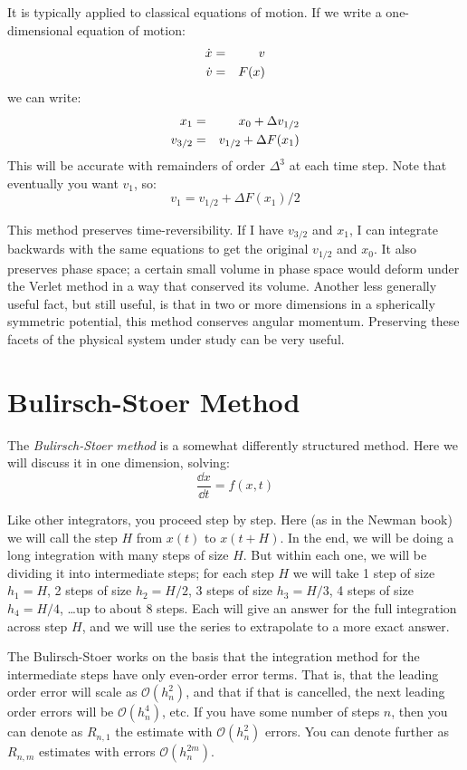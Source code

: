 It is typically applied to classical equations of motion. If we write
a one-dimensional equation of motion:
\begin{eqnarray}
{\dot x} &=& v \cr
{\dot v} &=& F(x)
\end{eqnarray}
we can write: 
\begin{eqnarray}
x_1 &=& x_0 + \Delta v_{1/2} \cr
v_{3/2} &=& v_{1/2} + \Delta F(x_1)
\end{eqnarray}
This will be accurate with remainders of order $\Delta^3$ at each time
step. Note that eventually you want $v_1$, so:
\begin{equation}
v_{1} = v_{1/2} + \Delta F(x_1) / 2
\end{equation}

This method preserves time-reversibility. If I have $v_{3/2}$ and
$x_1$, I can integrate backwards with the same equations to get the
original $v_{1/2}$ and $x_0$. It also preserves phase space; a certain
small volume in phase space would deform under the Verlet method in a
way that conserved its volume. Another less generally useful fact, but
still useful, is that in two or more dimensions in a spherically
symmetric potential, this method conserves angular
momentum. Preserving these facets of the physical system under study
can be very useful.

\section{Bulirsch-Stoer Method}

The {\it Bulirsch-Stoer method} is a somewhat differently structured
method. Here we will discuss it in one dimension, solving:
\begin{equation}
\frac{\dd{x}}{\dd{t}} = f(x,t)
\end{equation}

Like other integrators, you proceed step by step. Here (as in the
Newman book) we will call the step $H$ from $x(t)$ to $x(t+H)$. In the
end, we will be doing a long integration with many steps of size
$H$. But within each one, we will be dividing it into intermediate
steps; for each step $H$ we will take 1 step of size $h_1 =H$, 2 steps
of size $h_2 = H / 2$, 3 steps of size $h_3 = H/3$, 4 steps of size
$h_4 = H / 4$, \ldots up to about 8 steps.  Each will give an answer
for the full integration across step $H$, and we will use the series
to extrapolate to a more exact answer.

The Bulirsch-Stoer works on the basis that the integration method for
the intermediate steps have only even-order error terms. That is, that
the leading order error will scale as $\mathcal{O}(h_n^{2})$, and that
if that is cancelled, the next leading order errors will be
$\mathcal{O}(h_n^4)$, etc. If you have some number of steps $n$, then
you can denote as $R_{n,1}$ the estimate with $\mathcal{O}(h_n^{2})$
errors.  You can denote further as $R_{n,m}$ estimates with errors
$\mathcal{O}(h_n^{2m})$.

